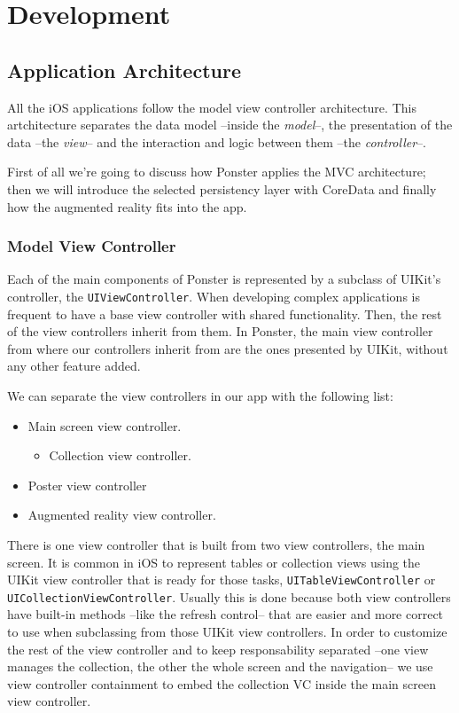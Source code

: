 \chapter{Development}
\section{Application Architecture}
\label{sec:architecture}
All the iOS applications follow the model view controller architecture. This
artchitecture separates the data model --inside the \emph{model}--, the presentation
of the data --the \emph{view}-- and the interaction and logic between them --the
\emph{controller}--. 

First of all we're going to discuss how Ponster applies the MVC
architecture; then we will introduce the selected persistency layer with CoreData
and finally how the augmented reality fits into the app.

\subsection{Model View Controller}
Each of the main components of Ponster is represented by a subclass of UIKit's
controller, the \texttt{UIViewController}. When developing complex applications is
frequent to have a base view controller with shared functionality. Then, the rest of
the view controllers inherit from them. In Ponster, the main view controller from
where our controllers inherit from are the ones presented by UIKit, without any
other feature added. 

We can separate the view controllers in our app with the following list:
\begin{itemize}
\item Main screen view controller.
\begin{itemize}
\item Collection view controller.
\end{itemize}
\item Poster view controller
\item Augmented reality view controller.
\end{itemize}

There is one view controller that is built from two view controllers, the main
screen. It is common in iOS to represent tables or collection views using the UIKit
view controller that is ready for those tasks, \texttt{UITableViewController} or
\texttt{UICollectionViewController}. Usually this is done because both view
controllers have built-in methods --like the refresh control-- that are easier and
more correct to use when subclassing from those UIKit view controllers. In order to
customize the rest of the view controller and to keep responsability separated --one
view manages the collection, the other the whole screen and the navigation-- we use
view controller containment to embed the collection VC inside the main screen view
controller. 

